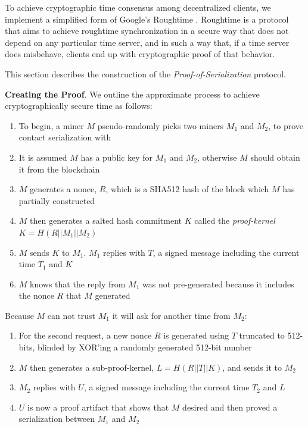 \documentclass[UTF8, 10pt, nonatbib, nocopyrightspace, reprint]{sigplanconf}
\begin{document}
To achieve cryptographic time consensus among decentralized clients, we implement a simplified form of Google's Roughtime \cite{roughtime}. Roughtime is a protocol that aims to achieve roughtime synchronization in a secure way that does not depend on any particular time server, and in such a way that, if a time server does misbehave, clients end up with cryptographic proof of that behavior.

This section describes the construction of the \emph{Proof-of-Serialization} protocol.

\textbf{Creating the Proof}. We outline the approximate process to achieve cryptographically secure time as follows:

\begin{enumerate}
        \item To begin, a miner $M$ pseudo-randomly picks two miners $M_1$ and $M_2$, to prove contact serialization with
        \item It is assumed $M$ has a public key for $M_1$ and $M_2$, otherwise $M$ should obtain it from the blockchain
        \item $M$ generates a nonce, $R$, which is a SHA512 hash of the block which $M$ has partially constructed
        \item $M$ then generates a salted hash commitment $K$ called the \emph{proof-kernel} ${K = H\left(R || M_1 || M_2\right)}$
        \item $M$ sends $K$ to $M_1$. $M_1$ replies with $T$, a signed message including the current time $T_1$ and $K$
        \item $M$ knows that the reply from $M_1$ was not pre-generated because it includes the nonce $R$ that $M$ generated
\end{enumerate}

Because $M$ can not trust $M_1$ it will ask for another time from $M_2$:

\begin{enumerate}
        \item For the second request, a new nonce $R$ is generated using $T$ truncated to 512-bits, blinded by XOR'ing a randomly generated 512-bit number
        \item $M$ then generates a sub-proof-kernel, $L = H\left(R || T || K\right)$, and sends it to $M_2$
        \item $M_2$ replies with $U$, a signed message including the current time $T_2$ and $L$
        \item $U$ is now a proof artifact that shows that $M$ desired and then proved a serialization between $M_1$ and $M_2$
\end{enumerate}
\end{document}

